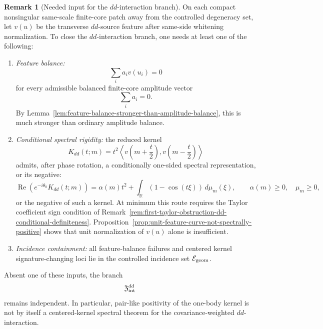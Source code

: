 \documentclass[11pt,a4paper]{amsart}
\theoremstyle{plain}
\theoremstyle{definition}
\newtheorem{remark}[theorem]{Remark}
\begin{document}
\begin{remark}[Needed input for the \(dd\)-interaction branch]
\label{rem:feature-balance-or-spectral-positivity-dd-needed}
On each compact nonsingular same-scale finite-core patch away from the
controlled degeneracy set, let \(v(u)\) be the transverse \(dd\)-source feature
after same-side whitening normalization.  To close the \(dd\)-interaction
branch, one needs at least one of the following:
\begin{enumerate}
\item \emph{Feature balance:}
\[
\sum_i a_i v(u_i)=0
\]
for every admissible balanced finite-core amplitude vector
\[
\sum_i a_i=0.
\]
By Lemma~\ref{lem:feature-balance-stronger-than-amplitude-balance}, this is
much stronger than ordinary amplitude balance.

\item \emph{Conditional spectral rigidity:} the reduced kernel
\[
K_{dd}(t;m)
=
t^2
\left\langle
v\!\left(m+\frac t2\right),
v\!\left(m-\frac t2\right)
\right\rangle
\]
admits, after phase rotation, a conditionally one-sided spectral
representation, or its negative:
\[
\operatorname{Re}(e^{-i\theta_0}K_{dd}(t;m))
=
\alpha(m)t^2+
\int_{\mathbb R}(1-\cos(t\xi))\,d\mu_m(\xi),
\qquad
\alpha(m)\ge0,\quad \mu_m\ge0,
\]
or the negative of such a kernel.  At minimum this route requires the Taylor
coefficient sign condition of
Remark~\ref{rem:first-taylor-obstruction-dd-conditional-definiteness}.
Proposition~\ref{prop:unit-feature-curve-not-spectrally-positive} shows that
unit normalization of \(v(u)\) alone is insufficient.

\item \emph{Incidence containment:} all feature-balance failures and centered
kernel signature-changing loci lie in the controlled incidence set
\(\mathcal E_{\rm geom}\).
\end{enumerate}
Absent one of these inputs, the branch
\[
\mathfrak Z_{\rm int}^{dd}
\]
remains independent.  In particular, pair-like positivity of the one-body
kernel is not by itself a centered-kernel spectral theorem for the
covariance-weighted \(dd\)-interaction.
\end{remark}
\end{document}
